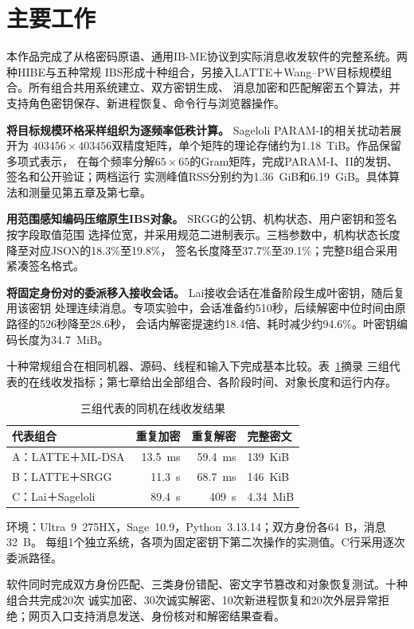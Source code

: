 \section{主要工作}

本作品完成了从格密码原语、通用IB-ME协议到实际消息收发软件的完整系统。两种HIBE与五种常规
IBS形成十种组合，另接入LATTE＋Wang--PW目标规模组合。所有组合共用系统建立、双方密钥生成、
消息加密和匹配解密五个算法，并支持角色密钥保存、新进程恢复、命令行与浏览器操作。

\textbf{将目标规模环格采样组织为逐频率低秩计算。} Sageloli PARAM-I的相关扰动若展开为
$403456\times403456$双精度矩阵，单个矩阵的理论存储约为1.18~TiB。作品保留多项式表示，
在每个频率分解$65\times65$的Gram矩阵，完成PARAM-I、II的发钥、签名和公开验证；两档运行
实测峰值RSS分别约为1.36~GiB和6.19~GiB。具体算法和测量见第五章及第七章。

\textbf{用范围感知编码压缩原生IBS对象。} SRGG的公钥、机构状态、用户密钥和签名按字段取值范围
选择位宽，并采用规范二进制表示。三档参数中，机构状态长度降至对应JSON的18.3\%至19.8\%，
签名长度降至37.7\%至39.1\%；完整B组合采用紧凑签名格式。

\textbf{将固定身份对的委派移入接收会话。} Lai接收会话在准备阶段生成叶密钥，随后复用该密钥
处理连续消息。专项实验中，会话准备约510秒，后续解密中位时间由原路径的526秒降至28.6秒，
会话内解密提速约18.4倍、耗时减少约94.6\%。叶密钥编码长度为34.7~MiB。

十种常规组合在相同机器、源码、线程和输入下完成基本比较。表~\ref{tab:work-highlights}摘录
三组代表的在线收发指标；第七章给出全部组合、各阶段时间、对象长度和运行内存。

\begin{table}[H]
\centering\small
\caption{三组代表的同机在线收发结果}
\label{tab:work-highlights}
\begin{tabularx}{\textwidth}{@{}p{}rrX@{}}
\toprule
\rowcolor{black!8} 代表组合 & 重复加密 & 重复解密 & 完整密文 \\
\midrule
A：LATTE＋ML-DSA & 13.5~ms & 59.4~ms & 139~KiB \\
B：LATTE＋SRGG & 11.3~s & 68.7~ms & 146~KiB \\
C：Lai＋Sageloli & 89.4~s & 409~s & 4.34~MiB \\
\bottomrule
\end{tabularx}
\begin{minipage}{.98\textwidth}\footnotesize
环境：Ultra~9~275HX，Sage~10.9，Python~3.13.14；双方身份各64~B，消息32~B。
每组1个独立系统，各项为固定密钥下第二次操作的实测值。C行采用逐次委派路径。
\end{minipage}
\end{table}

软件同时完成双方身份匹配、三类身份错配、密文字节篡改和对象恢复测试。十种组合共完成20次
诚实加密、30次诚实解密、10次新进程恢复和20次外层异常拒绝；网页入口支持消息发送、身份核对和解密结果查看。
